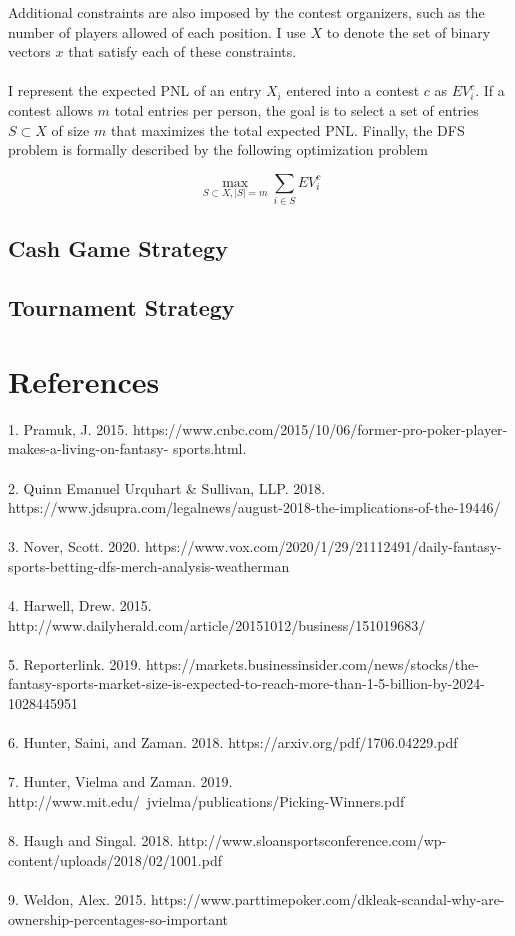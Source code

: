 \documentclass{article}
\begin{document}
\noindent Additional constraints are also imposed by the contest organizers, such as the number of players allowed of each position. I use $X$ to denote the set of binary vectors $x$ that satisfy each of these constraints.\\
\\
I represent the expected PNL of an entry $X_i$ entered into a contest $c$ as ${EV}_i^c$. If a contest allows $m$ total entries per person, the goal is to select a set of entries $S \subset X$ of size $m$ that maximizes the total expected PNL. Finally, the DFS problem is formally described by the following optimization problem

\begin{equation}
\max_{S \subset X, |S| = m} \sum_{i \in S} {EV}_i^c
\end{equation}

\subsection{Cash Game Strategy}

\subsection{Tournament Strategy}


\section*{References}

1. Pramuk, J. 2015. https://www.cnbc.com/2015/10/06/former-pro-poker-player-makes-a-living-on-fantasy- sports.html.\\
\\
2. Quinn Emanuel Urquhart \& Sullivan, LLP. 2018. https://www.jdsupra.com/legalnews/august-2018-the-implications-of-the-19446/\\
\\
3. Nover, Scott. 2020. https://www.vox.com/2020/1/29/21112491/daily-fantasy-sports-betting-dfs-merch-analysis-weatherman\\
\\
4. Harwell, Drew. 2015. http://www.dailyherald.com/article/20151012/business/151019683/\\
\\
5. Reporterlink. 2019. https://markets.businessinsider.com/news/stocks/the-fantasy-sports-market-size-is-expected-to-reach-more-than-1-5-billion-by-2024-1028445951\\
\\
6. Hunter, Saini, and Zaman. 2018. https://arxiv.org/pdf/1706.04229.pdf\\
\\
7. Hunter, Vielma and Zaman. 2019. http://www.mit.edu/~jvielma/publications/Picking-Winners.pdf\\
\\
8. Haugh and Singal. 2018. http://www.sloansportsconference.com/wp-content/uploads/2018/02/1001.pdf\\
\\
9. Weldon, Alex. 2015. https://www.parttimepoker.com/dkleak-scandal-why-are-ownership-percentages-so-important
\end{document}
